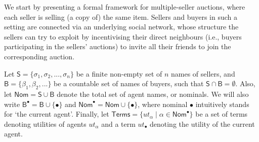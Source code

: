 \documentclass[letterpaper]{article} %
\theoremstyle{definition}
\newcommand{\laurent}[1]{{[\color{purple}#1]}}
\begin{document}

We start by presenting a formal framework for multiple-seller auctions, where each seller is selling (a copy of) the same item. Sellers and buyers in such a setting are connected via an underlying social network, whose structure the sellers can try to exploit by incentivising their direct neighbours (i.e., buyers participating in the sellers' auctions) to invite all their friends to join the corresponding auction.

Let $\mathsf{S} = \{\sigma_1, \sigma_2, ..., \sigma_n\}$ be a finite non-empty set of $n$ names of sellers, and $\mathsf{B} = \{\beta_1, \beta_2, ...\}$ be a countable set of names of buyers, such that $\mathsf{S} \cap \mathsf{B} = \emptyset$.  Also, let $\mathsf{Nom} = \mathsf{S} \cup \mathsf{B}$ denote the total set of agent names, or nominals. We will also write $\mathsf{B}^\bullet = \mathsf{B} \cup \{\bullet\}$ and $\mathsf{Nom}^\bullet = \mathsf{Nom} \cup \{\bullet\}$, where nominal $\bullet$ intuitively stands for `the current agent'. Finally, let $\mathsf{Terms} = \{ut_\alpha \mid \alpha \in \mathsf{Nom}^\bullet\}$ %
be a set of terms denoting utilities of agents $ut_\alpha$ and a %
term $ut_\bullet$ denoting the utility of the current agent. 
\end{document}
